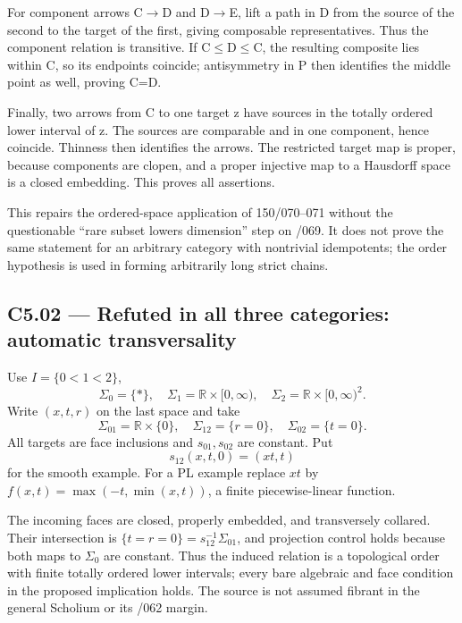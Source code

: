 For component arrows C\ensuremath{\to}D and D\ensuremath{\to}E, lift a path in D from the source of the second to the target of the first, giving composable representatives. Thus the component relation is transitive. If C\ensuremath{\le}D\ensuremath{\le}C, the resulting composite lies within C, so its endpoints coincide; antisymmetry in P then identifies the middle point as well, proving C=D.

Finally, two arrows from C to one target z have sources in the totally ordered lower interval of z. The sources are comparable and in one component, hence coincide. Thinness then identifies the arrows. The restricted target map is proper, because components are clopen, and a proper injective map to a Hausdorff space is a closed embedding. This proves all assertions.

This repairs the ordered-space application of 150/070--071 without the questionable ``rare subset lowers dimension'' step on /069. It does not prove the same statement for an arbitrary category with nontrivial idempotents; the order hypothesis is used in forming arbitrarily long strict chains.

\subsection{C5.02 --- Refuted in all three categories: automatic transversality}\label{c5.02-refuted-in-all-three-categories-automatic-transversality}

Use \(I=\{0<1<2\}\), \[
 \Sigma_0=\{*\},\quad
 \Sigma_1=\mathbb R\times[0,\infty),\quad
 \Sigma_2=\mathbb R\times[0,\infty)^2.
\] Write \((x,t,r)\) on the last space and take \[
 \Sigma_{01}=\mathbb R\times\{0\},\quad
 \Sigma_{12}=\{r=0\},\quad
 \Sigma_{02}=\{t=0\}.
\] All targets are face inclusions and \(s_{01},s_{02}\) are constant. Put \[
 s_{12}(x,t,0)=(xt,t)
\] for the smooth example. For a PL example replace \(xt\) by \(f(x,t)=\max(-t,\min(x,t))\), a finite piecewise-linear function.

The incoming faces are closed, properly embedded, and transversely collared. Their intersection is \(\{t=r=0\}=s_{12}^{-1}\Sigma_{01}\), and projection control holds because both maps to \(\Sigma_0\) are constant. Thus the induced relation is a topological order with finite totally ordered lower intervals; every bare algebraic and face condition in the proposed implication holds. The source is not assumed fibrant in the general Scholium or its /062 margin.

